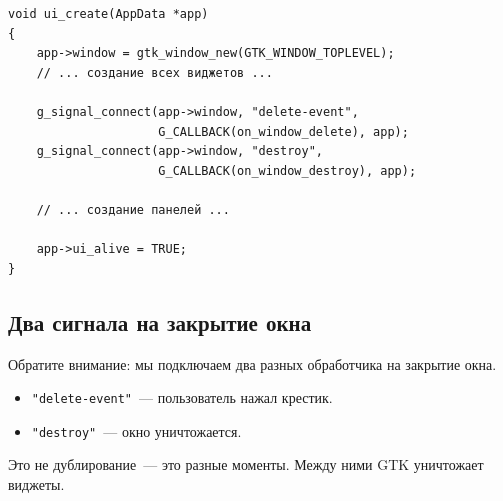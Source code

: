 \begin{listing}[htbp]
\begin{verbatim}
void ui_create(AppData *app)
{
    app->window = gtk_window_new(GTK_WINDOW_TOPLEVEL);
    // ... создание всех виджетов ...

    g_signal_connect(app->window, "delete-event",
                     G_CALLBACK(on_window_delete), app);
    g_signal_connect(app->window, "destroy",
                     G_CALLBACK(on_window_destroy), app);

    // ... создание панелей ...

    app->ui_alive = TRUE;
}
\end{verbatim}
\caption{\texttt{ui\_create()}}
\label{lst:lifecycle-ui}
\end{listing}

\subsection{Два сигнала на закрытие окна}

Обратите внимание: мы подключаем два разных
обработчика на закрытие окна.

\begin{itemize}
    \item \texttt{"delete-event"}~--- пользователь
          нажал крестик.
    \item \texttt{"destroy"}~--- окно уничтожается.
\end{itemize}

Это не дублирование~--- это разные моменты.
Между ними GTK уничтожает виджеты.

